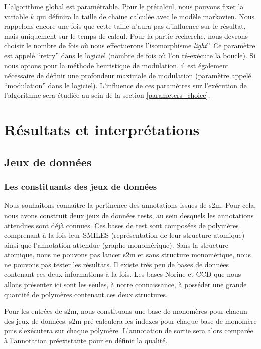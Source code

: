 L'algorithme global est paramétrable.
Pour le précalcul, nous pouvons fixer la variable $k$ qui définira la taille de chaine calculée avec le modèle markovien.
Nous rappelons encore une fois que cette taille n'aura pas d'influence sur le résultat, mais uniquement sur le temps de calcul.
Pour la partie recherche, nous devrons choisir le nombre de fois où nous effectuerons l'isomorphisme \textit{light}''.
Ce paramètre est appelé ``retry'' dans le logiciel (nombre de fois où l'on ré-exécute la boucle).
Si nous optons pour la méthode heuristique de modulation, il est également nécessaire de définir une profondeur maximale de modulation (paramètre appelé ``modulation'' dans le logiciel).
L'influence de ces paramètres sur l'exécution de l'algorithme sera étudiée au sein de la section \ref{parameters_choice}.




\section{Résultats et interprétations}

\label{res_int}

\subsection{Jeux de données}

\subsubsection{Les constituants des jeux de données}

Nous souhaitons connaître la pertinence des annotations issues de s2m.
Pour cela, nous avons construit deux jeux de données tests, au sein desquels les annotations attendues sont déjà connues.
Ces bases de test sont composées de polymères comprenant à la fois leur SMILES (représentation de leur structure atomique) ainsi que l'annotation attendue (graphe monomérique).
Sans la structure atomique, nous ne pouvons pas lancer s2m et sans structure monomérique, nous ne pouvons pas tester les résultats.
Il existe très peu de bases de données contenant ces deux informations à la fois.
Les bases Norine et CCD que nous allons présenter ici sont les seules, à notre connaissance, à posséder une grande quantité de polymères contenant ces deux structures.

Pour les entrées de s2m, nous constituons une base de monomères pour chacun des jeux de données.
s2m pré-calculera les indexes pour chaque base de monomère puis s'exécutera sur chaque polymère.
L'annotation de sortie sera alors comparée à l'annotation préexistante pour en définir la qualité.


